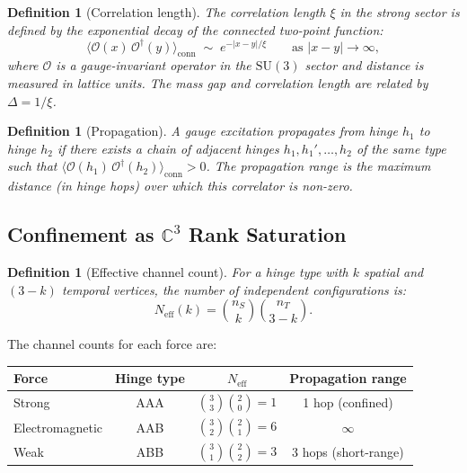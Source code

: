 \documentclass[12pt]{article}
\newtheorem{definition}[theorem]{Definition}
\theoremstyle{remark}
\theoremstyle{definition}
\newcommand{\CC}{\mathbb{C}}
\begin{document}
\begin{definition}[Correlation length]
\label{def:correlation}
The \emph{correlation length} $\xi$ in the strong sector is defined by
the exponential decay of the connected two-point function:
\begin{equation}
\langle \mathcal{O}(x)\, \mathcal{O}^\dagger(y) \rangle_{\mathrm{conn}}
\;\sim\; e^{-|x - y|/\xi} \qquad \text{as } |x-y| \to \infty,
\end{equation}
where $\mathcal{O}$ is a gauge-invariant operator in the
$\mathrm{SU}(3)$ sector and distance is measured in lattice units.
The mass gap and correlation length are related by $\Delta = 1/\xi$.
\end{definition}

\begin{definition}[Propagation]
\label{def:propagation}
A gauge excitation \emph{propagates} from hinge $h_1$ to hinge $h_2$
if there exists a chain of adjacent hinges $h_1, h_1', \ldots, h_2$
of the same type such that $\langle \mathcal{O}(h_1)\,
\mathcal{O}^\dagger(h_2) \rangle_{\mathrm{conn}} > 0$.
The \emph{propagation range} is the maximum distance (in hinge hops)
over which this correlator is non-zero.
\end{definition}

\subsection{Confinement as $\CC^3$ Rank Saturation}
\label{sec:confinement}

\begin{definition}[Effective channel count]
For a hinge type with $k$ spatial and $(3-k)$ temporal vertices, the
number of independent configurations is:
\begin{equation}
N_{\mathrm{eff}}(k) = \binom{n_S}{k} \binom{n_T}{3-k}.
\end{equation}
\end{definition}

\noindent
The channel counts for each force are:

\begin{center}
\begin{tabular}{lccc}
\hline
Force & Hinge type & $N_{\mathrm{eff}}$ & Propagation range \\
\hline
Strong & AAA & $\binom{3}{3}\binom{2}{0} = 1$ & 1 hop (confined) \\
Electromagnetic & AAB & $\binom{3}{2}\binom{2}{1} = 6$ & $\infty$ \\
Weak & ABB & $\binom{3}{1}\binom{2}{2} = 3$ & 3 hops (short-range) \\
\hline
\end{tabular}
\end{center}
\end{document}
